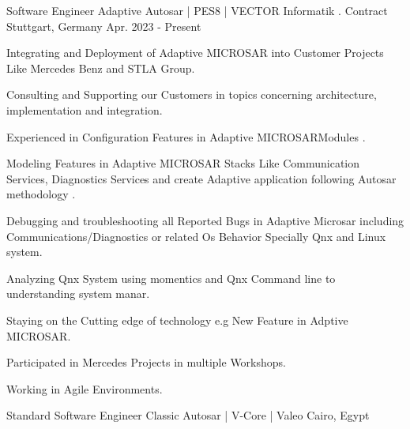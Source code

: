 \begin{cventries}
  \cventry
    {\normalsize Software Engineer} %
    {\Large Adaptive Autosar | PES8 | VECTOR Informatik . Contract} %
    {\normalsize Stuttgart, Germany} %
    {\normalsize Apr. 2023 - Present} %
    {
      \begin{cvitems} %
        \item {\normalsize Integrating and Deployment of Adaptive MICROSAR into Customer Projects Like Mercedes Benz and STLA Group.}
        \item {\normalsize Consulting and Supporting our Customers in topics concerning architecture, implementation and integration.}
        \item {\normalsize Experienced in Configuration Features in Adaptive MICROSARModules .}
        \item {\normalsize Modeling Features in Adaptive MICROSAR Stacks Like Communication Services, Diagnostics Services and create Adaptive application following Autosar methodology .}
        \item {\normalsize Debugging and troubleshooting all Reported Bugs in Adaptive Microsar including Communications/Diagnostics or related Os Behavior Specially Qnx and Linux system.}
        \item {\normalsize Analyzing Qnx System using momentics and Qnx Command line to understanding system manar.}
        \item {\normalsize Staying on the Cutting edge of technology e.g New Feature in Adptive MICROSAR.}
        \item {\normalsize Participated in Mercedes Projects in multiple Workshops.}
        \item {\normalsize Working in Agile Environments.}
      \end{cvitems}
    }
  \cventry
    {\normalsize Standard Software Engineer} %
    {\Large Classic Autosar | V-Core | Valeo} %
    {\normalsize Cairo, Egypt} %

\end{cventries}

